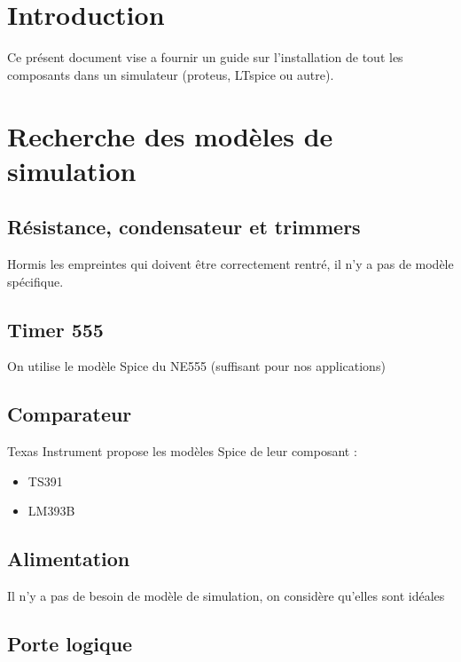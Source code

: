 \documentclass{EPSA-rap-template}
\begin{document}
\fairepagedegarde
\newpage
\tableofcontents

\newpage

\section{Introduction}

Ce présent document vise a fournir un guide sur l'installation de tout les composants dans un simulateur (proteus, LTspice ou autre).

\section{Recherche des modèles de simulation}

\subsection{Résistance, condensateur et trimmers}

Hormis les empreintes qui doivent être correctement rentré, il n'y a pas de modèle spécifique.

\subsection{Timer 555}

On utilise le modèle Spice du NE555 (suffisant pour nos applications)

\subsection{Comparateur}

Texas Instrument propose les modèles Spice de leur composant : 
\begin{itemize}
\item TS391
\item LM393B
\end{itemize}

\subsection{Alimentation}

Il n'y a pas de besoin de modèle de simulation, on considère qu'elles sont idéales

\subsection{Porte logique}
\end{document}
